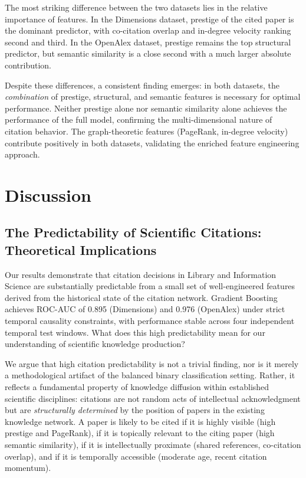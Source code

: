 \documentclass[12pt,a4paper]{article}
\begin{document}
The most striking difference between the two datasets lies in the relative
importance of features. In the Dimensions dataset, prestige of the cited paper is
the dominant predictor, with co-citation overlap and in-degree velocity ranking
second and third. In the OpenAlex dataset, prestige remains the top structural
predictor, but semantic similarity is a close second with a much larger absolute
contribution.

Despite these differences, a consistent finding emerges: in both datasets, the
\textit{combination} of prestige, structural, and semantic features is necessary
for optimal performance. Neither prestige alone nor semantic similarity alone
achieves the performance of the full model, confirming the multi-dimensional nature
of citation behavior. The graph-theoretic features (PageRank, in-degree velocity)
contribute positively in both datasets, validating the enriched feature engineering
approach.

\section{Discussion}
\label{sec:discussion}

\subsection{The Predictability of Scientific Citations: Theoretical Implications}

Our results demonstrate that citation decisions in Library and Information Science
are substantially predictable from a small set of well-engineered features derived
from the historical state of the citation network. Gradient Boosting achieves
ROC-AUC of 0.895 (Dimensions) and 0.976 (OpenAlex) under strict temporal causality
constraints, with performance stable across four independent temporal test windows.
What does this high predictability mean for our understanding of scientific
knowledge production?

We argue that high citation predictability is not a trivial finding, nor is it
merely a methodological artifact of the balanced binary classification setting.
Rather, it reflects a fundamental property of knowledge diffusion within established
scientific disciplines: citations are not random acts of intellectual acknowledgment
but are \textit{structurally determined} by the position of papers in the existing
knowledge network. A paper is likely to be cited if it is highly visible (high
prestige and PageRank), if it is topically relevant to the citing paper (high
semantic similarity), if it is intellectually proximate (shared references,
co-citation overlap), and if it is temporally accessible (moderate age, recent
citation momentum).
\end{document}
